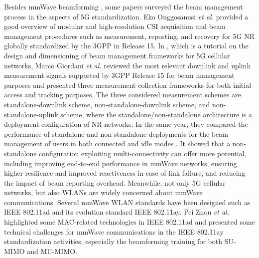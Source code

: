 \documentclass[journal,comsoc]{IEEEtran}
\begin{document}
Besides mmWave beamforming \cite{Successive-Localization-Beamforming}, some papers surveyed the beam management process in the aspects of 5G standardization. Eko Onggosanusi \emph{et al.} \cite{Modular-CSI-Beam-Management-2018} provided a good overview of modular and high-resolution CSI acquisition and beam management procedures such as measurement, reporting, and recovery for 5G NR globally standardized by the 3GPP in Release 15. In \cite{Tutorial-Beam-Management-3GPP-NR-2019}, which is a tutorial on the design and dimensioning of beam management frameworks for 5G cellular networks, Marco Giordani \emph{et al.} reviewed the most relevant downlink and uplink measurement signals supported by 3GPP Release 15 for beam management purposes and presented three measurement collection frameworks for both initial access and tracking purposes. The three considered measurement schemes are standalone-downlink scheme, non-standalone-downlink scheme, and non-standalone-uplink scheme, where the standalone/non-standalone architecture is a deployment configuration of NR networks. In the same year, they compared the performance of standalone and non-standalone deployments for the beam management of users in both connected and idle modes \cite{Standalone-Non-Standalone-Beam-Management-3GPP-NR-2019}. It showed that a non-standalone configuration exploiting multi-connectivity can offer more potential, including improving end-to-end performance in mmWave networks, ensuring higher resilience and improved reactiveness in case of link failure, and reducing the impact of beam reporting overhead. Meanwhile, not only 5G cellular networks, but also WLANs are widely concerned about mmWave communications. Several mmWave WLAN standards have been designed such as IEEE 802.11ad and its evolution standard IEEE 802.11ay. Pei Zhou \emph{et al.} \cite{802.11ay-2018} highlighted some MAC-related technologies in IEEE 802.11ad and presented some technical challenges for mmWave communications in the IEEE 802.11ay standardization activities, especially the beamforming training for both SU-MIMO and MU-MIMO.
\end{document}
